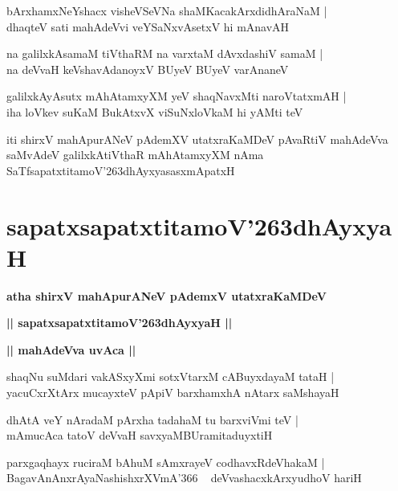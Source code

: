 \documentclass[twoside,12pt,openright]{book}
\def\S{\char'263}
\newcounter{shloka}[chapter]
\def\uvaca#1{\centerline{{\large\textbf{#1}}}}
\begin{document}
\begin{shloka}%
bArxhamxNeYshacx visheVSeVNa shaMKacakArxdidhAraNaM |\\
dhaqteV sati mahAdeVvi veYSaNxvAsetxV hi mAnavAH 
\end{shloka}

\begin{shloka}%
na galilxkAsamaM tiVthaRM na varxtaM dAvxdashiV samaM |\\
na deVvaH keVshavAdanoyxV BUyeV BUyeV varAnaneV 
\end{shloka}

\begin{shloka}%
galilxkAyAsutx mAhAtamxyXM yeV shaqNavxMti naroVtatxmAH |\\
iha loVkev suKaM BukAtxvX viSuNxloVkaM hi yAMti teV
\end{shloka}

\begin{center}
iti shirxV mahApurANeV pAdemXV utatxraKaMDeV pAvaRtiV mahAdeVva saMvAdeV galilxkAtiVthaR 
mAhAtamxyXM nAma SaTfsapatxtitamoV\S dhAyxyasasxmApatxH 
\end{center}


\chapter{sapatxsapatxtitamoV\S dhAyxyaH}

\begin{center}
{\LARGE\bfseries atha shirxV mahApurANeV pAdemxV utatxraKaMDeV}
\end{center}

\begin{center}
{\LARGE\bfseries || sapatxsapatxtitamoV\S dhAyxyaH || }
\end{center}

\uvaca{|| mahAdeVva uvAca ||}

\begin{shloka}%
shaqNu suMdari vakASxyXmi sotxVtarxM cABuyxdayaM tataH |\\
yacuCxrXtArx mucayxteV pApiV barxhamxhA nAtarx saMshayaH 
\end{shloka}

\begin{shloka}%
dhAtA veY nAradaM pArxha tadahaM tu barxviVmi teV |\\
mAmucAca tatoV deVvaH savxyaMBUramitaduyxtiH
\end{shloka}

\begin{shloka}%
parxgaqhayx ruciraM bAhuM sAmxrayeV codhavxRdeVhakaM |\\
BagavAnAnxrAyaNashishxrXVmA\char'366 ~ deVvashacxkArxyudhoV hariH 
\end{shloka}
\end{document}
